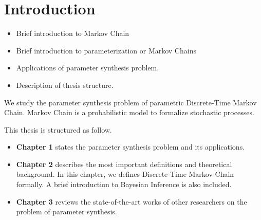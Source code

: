 \chapter{Introduction} 
{\color{red}
  \begin{itemize}
  \item Brief introduction to Markov Chain
  \item Brief introduction to parameterization or Markov Chains
  \item Applications of parameter synthesis problem.
  \item Description of thesis structure.
  \end{itemize}
}
We study the parameter synthesis problem of parametric Discrete-Time Markov
Chain. Markov Chain is a probabilistic model to formalize stochastic
processes. 

This thesis is structured as follow.
\begin{itemize}
\item \textbf{Chapter 1} states the parameter synthesis problem and its applications.
\item \textbf{Chapter 2} describes the most important definitions and
  theoretical background. In this chapter, we defines Discrete-Time Markov Chain
  formally. A brief introduction to Bayesian Inference is also included.
\item \textbf{Chapter 3} reviews the state-of-the-art works of other researchers
  on the problem of parameter synthesis. 
\end{itemize}